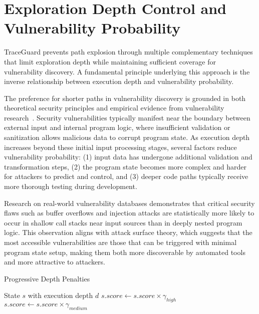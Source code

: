 \section{Exploration Depth Control and Vulnerability Probability}\label{sec:exploration_depth_control}

TraceGuard prevents path explosion through multiple complementary techniques that limit exploration depth while maintaining sufficient coverage for vulnerability discovery. A fundamental principle underlying this approach is the inverse relationship between execution depth and vulnerability probability.

The preference for shorter paths in vulnerability discovery is grounded in both theoretical security principles and empirical evidence from vulnerability research~\cite{schwartz_all_2010}. Security vulnerabilities typically manifest near the boundary between external input and internal program logic, where insufficient validation or sanitization allows malicious data to corrupt program state. As execution depth increases beyond these initial input processing stages, several factors reduce vulnerability probability: (1) input data has undergone additional validation and transformation steps, (2) the program state becomes more complex and harder for attackers to predict and control, and (3) deeper code paths typically receive more thorough testing during development.

Research on real-world vulnerability databases demonstrates that critical security flaws such as buffer overflows and injection attacks are statistically more likely to occur in shallow call stacks near input sources than in deeply nested program logic. This observation aligns with attack surface theory, which suggests that the most accessible vulnerabilities are those that can be triggered with minimal program state setup, making them both more discoverable by automated tools and more attractive to attackers.

\begin{algorithm}[H]
    \caption{Progressive Depth Penalties}
    \label{alg:depth_penalties}
    \begin{algorithmic}[1]
        \Require State $s$ with execution depth $d$
        \State $s.score \gets s.score \times \gamma_{high}$
        \State $s.score \gets s.score \times \gamma_{medium}$
        \EndIf
    \end{algorithmic}
\end{algorithm}

